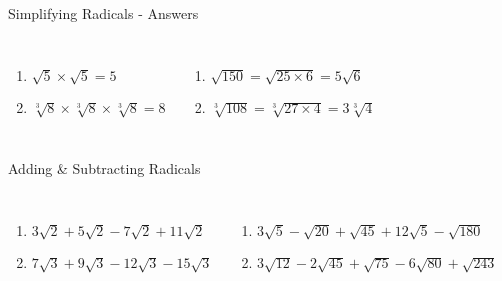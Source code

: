 \documentclass[aspectratio=169]{beamer}
\begin{document}
\begin{frame}{Simplifying Radicals - Answers}
\begin{tcolorbox}[colback=lightgray,colframe=primary,title=Solutions]
\footnotesize
\begin{columns}[T]
\begin{enumerate}
  \item $\sqrt{5} \times \sqrt{5} = 5$
  \item $\sqrt[3]{8} \times \sqrt[3]{8} \times \sqrt[3]{8} = 8$
\end{enumerate}
\begin{enumerate}
  \item $\sqrt{150} = \sqrt{25 \times 6} = 5\sqrt{6}$
  \item $\sqrt[3]{108} = \sqrt[3]{27 \times 4} = 3\sqrt[3]{4}$
\end{enumerate}
\end{columns}
\end{tcolorbox}
\end{frame}

\begin{frame}{Adding \& Subtracting Radicals}
\begin{tcolorbox}[colback=lightgray,colframe=accent,title=Practice Problems]
\footnotesize
\begin{columns}[T]
\begin{enumerate}
  \item $3\sqrt{2} + 5\sqrt{2} - 7\sqrt{2} + 11\sqrt{2}$
  \item $7\sqrt{3} + 9\sqrt{3} - 12\sqrt{3} - 15\sqrt{3}$
\end{enumerate}
\begin{enumerate}
  \item $3\sqrt{5} - \sqrt{20} + \sqrt{45} + 12\sqrt{5} - \sqrt{180}$
  \item $3\sqrt{12} - 2\sqrt{45} + \sqrt{75} - 6\sqrt{80} + \sqrt{243}$
\end{enumerate}
\end{columns}
\end{tcolorbox}
\end{frame}
\end{document}
